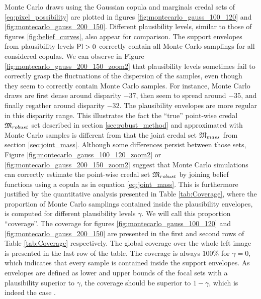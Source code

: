 Monte Carlo draws using the Gaussian copula and marginals credal sets of \ref{eq:pixel_possibility} are plotted in figures \ref{fig:montecarlo_gauss_100_120} and \ref{fig:montecarlo_gauss_200_150}. Different plausibility levels, similar to those of figures \ref{fig:belief_curves}, also appear for comparison. The support envelopes from plausibility levels ${\mathrm{Pl}}>0$ correctly contain all Monte Carlo samplings for all considered copulas. We can observe in Figure \ref{fig:montecarlo_gauss_200_150_zoom2} that plausibility levels sometimes fail to correctly grasp the fluctuations of the dispersion of the samples, even though they seem to correctly contain Monte Carlo samples. For instance, Monte Carlo draws are first dense around disparity $-37$, then seem to spread around $-35$, and finally regather around disparity $-32$. The plausibility envelopes are more regular in this disparity range. This illustrates the fact the ``true'' point-wise credal ${\mathfrak{M}}_{robust}$ set described in section \ref{sec:robust_method} and approximated with Monte Carlo samples is different from that the joint credal set ${\mathfrak{M}}_{mass}$ from section \ref{sec:joint_mass}. Although some differences persist between those sets, Figure \ref{fig:montecarlo_gauss_100_120_zoom2} or \ref{fig:montecarlo_gauss_200_150_zoom2} suggest that Monte Carlo simulations can correctly estimate the point-wise credal set ${\mathfrak{M}}_{robust}$ by joining belief functions using a copula as in equation \eqref{eq:joint_mass}. This is furthermore justified by the  quantitative analysis presented in Table \ref{tab:Coverage}, where the proportion of Monte Carlo samplings contained inside the plausibility envelopes, is computed for different plausibility levels $\gamma$. We will call this proportion ``coverage''. The coverage for figures \ref{fig:montecarlo_gauss_100_120} and \ref{fig:montecarlo_gauss_200_150} are presented in the first and second rows of Table \ref{tab:Coverage} respectively. The global coverage over the whole left image is presented in the last row of the table. The coverage is always $100\%$ for $\gamma=0$, which indicates that every sample is contained inside the support envelopes.  As envelopes are defined as lower and upper bounds of the focal sets with a plausibility superior to $\gamma$, the coverage should be superior to $1-\gamma$, which is indeed the case .


